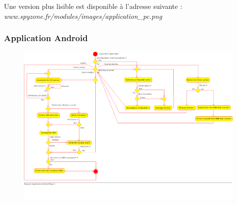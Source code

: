 Une version plus lisible est disponible à l'adresse suivante : 
\emph{www.spyzone.fr/modules/images/application\_pc.png}
\newpage{}

\subsubsection{Application Android}
\begin{figure}[h!]
\begin{center}
\includegraphics[width=20cm, angle=90]{uml/application_android.pdf}
\end{center}
\end{figure}

